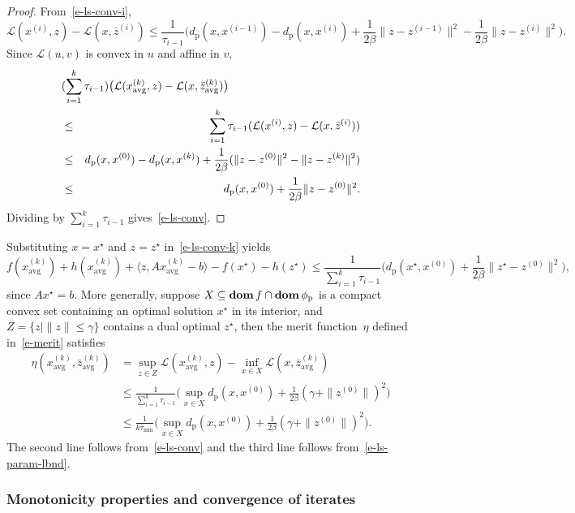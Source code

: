 \documentclass[letterpaper,11pt]{article}
\newcommand{\BEA}{\begin{eqnarray}}
\newcommand{\EEA}{\end{eqnarray}}
\newcommand{\dom}{\mathop{\bf dom}}
\newcommand{\inprod}[2]{\langle#1, #2\rangle}
\newcommand{\avg}{\mathrm{avg}}
\newcommand{\primal}{\mathrm p}
\newcommand{\cL}{\mathcal L}
\begin{document}
\begin{proof}
From~\eqref{e-ls-conv-i},
\[
\cL(x^{(i)},z)-\cL(x, \bar z^{(i)}) \leq \frac{1}{\tau_{i-1}}
\Big(d_\primal(x,x^{(i-1)}) - d_\primal(x,x^{(i)})
+ \frac{1}{2\beta} \|z-z^{(i-1)}\|^2
- \frac{1}{2\beta} \|z-z^{(i)}\|^2 \Big).
\]
Since $\cL(u,v)$ is convex in $u$ and affine in $v$,
\BEA
\lefteqn{(\sum_{i=1}^k \tau_{i-1}) 
  \big(\cL(x^{(k)}_\avg, z)-\cL(x, \bar z^{(k)}_\avg)\big)} \nonumber \\
&\leq &\sum_{i=1}^k \tau_{i-1} (\cL(x^{(i)}, z)-\cL(x, \bar z^{(i)})) 
  \nonumber \\
&\leq & d_\primal(x,x^{(0)}) - d_\primal(x,x^{(k)}) +
  \frac{1}{2\beta} (\|z-z^{(0)}\|^2 - \|z-z^{(k)}\|^2) \nonumber \\
&\leq & d_\primal(x,x^{(0)}) + \frac{1}{2\beta} \|z-z^{(0)}\|^2.
  \label{e-ls-conv-k}
\EEA
Dividing by $\sum_{i=1}^k \tau_{i-1}$ gives~\eqref{e-ls-conv}.
\end{proof}

Substituting $x=x^\star$ and $z=z^\star$ in~\eqref{e-ls-conv-k} yields
\[
f(x^{(k)}_\avg) + h(x^{(k)}_\avg) + \inprod{z}{Ax^{(k)}_\avg-b} 
- f(x^\star) - h(z^\star) \leq
\frac{1}{\sum_{i=1}^k\tau_{i-1}} \big(d_\primal(x^\star,x^{(0)})
+ \frac{1}{2\beta} \|z^\star-z^{(0)}\|^2 \big),
\]
since $Ax^\star=b$.
More generally, suppose $X \subseteq \dom f \cap \dom \phi_\primal$
is a compact convex set containing an optimal solution $x^\star$
in its interior,
and $Z = \{z \mid \|z\| \leq \gamma\}$ contains a dual optimal $z^\star$,
then the merit function~$\eta$ defined in~\eqref{e-merit} satisfies
\begin{align*}
\eta(x_\avg^{(k)}, \bar z_\avg^{(k)})
&= \sup_{z \in Z} \mathcal L(x_\avg^{(k)},z)
  - \inf_{x \in X} \mathcal L(x,\bar z_\avg^{(k)}) \\
&\leq \frac{1}{\sum_{i=1}^k\tau_{i-1}} \Big(
  \sup_{x\in X} d_\primal(x,x^{(0)})
  + \frac{1}{2\beta} (\gamma + \|z^{(0)}\|)^2 \Big) \\
&\leq \frac{1}{k \tau_\mathrm{min}}
  \Big(\sup_{x \in X} d_\primal(x,x^{(0)})
  + \frac{1}{2\beta} (\gamma + \|z^{(0)}\|)^2 \Big).
\end{align*}
The second line follows from~\eqref{e-ls-conv}
and the third line follows from~\eqref{e-ls-param-lbnd}.

\subsubsection{Monotonicity properties and convergence of iterates}
\end{document}
